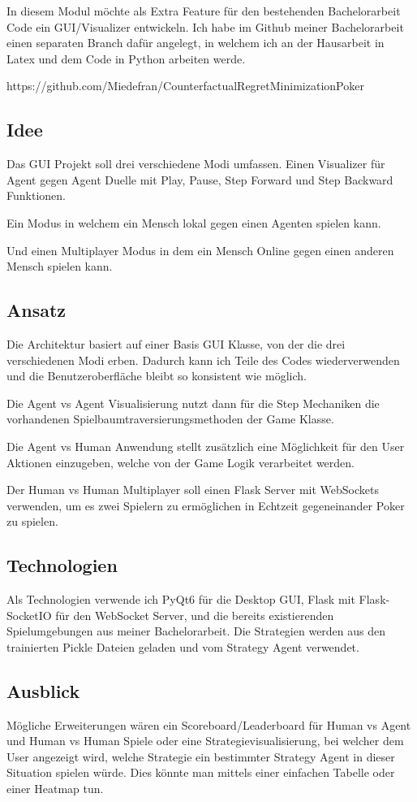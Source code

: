 \documentclass[12pt,german,english]{article}
\begin{document}
In diesem Modul möchte als Extra Feature für den bestehenden Bachelorarbeit Code ein GUI/Visualizer entwickeln.
Ich habe im Github meiner Bachelorarbeit einen separaten Branch dafür angelegt, in welchem ich an der Hausarbeit in Latex und dem Code in Python arbeiten werde.


https://github.com/Miedefran/CounterfactualRegretMinimizationPoker


\subsection{Idee}
Das GUI Projekt soll drei verschiedene Modi umfassen. Einen Visualizer für Agent gegen Agent Duelle mit Play, Pause, Step Forward und Step Backward Funktionen.


Ein Modus in welchem ein Mensch lokal gegen einen Agenten spielen kann. 


Und einen Multiplayer Modus in dem ein Mensch Online gegen einen anderen Mensch spielen kann.


\subsection{Ansatz}
Die Architektur basiert auf einer Basis GUI Klasse, von der die drei verschiedenen Modi erben. Dadurch kann ich Teile des Codes wiederverwenden und die Benutzeroberfläche bleibt so konsistent wie möglich.


Die Agent vs Agent Visualisierung nutzt dann für die Step Mechaniken die vorhandenen Spielbaumtraversierungsmethoden der Game Klasse.


Die Agent vs Human Anwendung stellt zusätzlich eine Möglichkeit für den User Aktionen einzugeben, welche von der Game Logik verarbeitet werden.


Der Human vs Human Multiplayer soll einen Flask Server mit WebSockets verwenden, um es zwei Spielern zu ermöglichen in Echtzeit gegeneinander Poker zu spielen.


\subsection{Technologien}
Als Technologien verwende ich PyQt6 für die Desktop GUI, Flask mit Flask-SocketIO für den WebSocket Server, und die bereits existierenden Spielumgebungen aus meiner Bachelorarbeit.
Die Strategien werden aus den trainierten Pickle Dateien geladen und vom Strategy Agent verwendet.


\subsection{Ausblick}
Mögliche Erweiterungen wären ein Scoreboard/Leaderboard für Human vs Agent und Human vs Human Spiele oder eine Strategievisualisierung, bei welcher dem User angezeigt wird, welche Strategie ein bestimmter Strategy Agent in dieser Situation spielen würde. Dies könnte man mittels einer einfachen Tabelle oder einer Heatmap tun.
\end{document}
